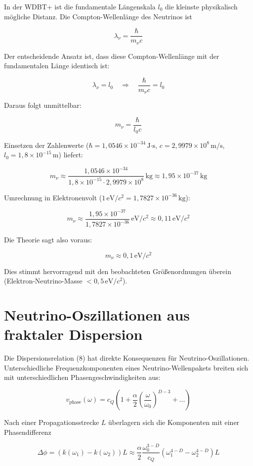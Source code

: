 \documentclass[12pt,a4paper]{article}
\begin{document}
In der WDBT+ ist die fundamentale Längenskala \(l_0\) die kleinste physikalisch mögliche Distanz. Die Compton-Wellenlänge des Neutrinos ist

\[
\lambda_\nu = \frac{\hbar}{m_\nu c}
\]

Der entscheidende Ansatz ist, dass diese Compton-Wellenlänge mit der fundamentalen Länge identisch ist:

\[
\lambda_\nu = l_0 \quad \Rightarrow \quad \frac{\hbar}{m_\nu c} = l_0
\]

Daraus folgt unmittelbar:

\[
\boxed{m_\nu = \frac{\hbar}{l_0 c}} \tag{9}
\]

Einsetzen der Zahlenwerte (\(\hbar = 1,0546 \times 10^{-34} \, \text{J·s}\), \(c = 2,9979 \times 10^8 \, \text{m/s}\), \(l_0 = 1,8 \times 10^{-15} \, \text{m}\)) liefert:

\[
m_\nu \approx \frac{1,0546 \times 10^{-34}}{1,8 \times 10^{-15} \cdot 2,9979 \times 10^8} \, \text{kg} \approx 1,95 \times 10^{-37} \, \text{kg}
\]

Umrechnung in Elektronenvolt (\(1 \, \text{eV}/c^2 = 1,7827 \times 10^{-36} \, \text{kg}\)):

\[
m_\nu \approx \frac{1,95 \times 10^{-37}}{1,7827 \times 10^{-36}} \, \text{eV}/c^2 \approx 0,11 \, \text{eV}/c^2
\]

Die Theorie sagt also voraus:

\[
\boxed{m_\nu \approx 0,1 \, \text{eV}/c^2} \tag{10}
\]

Dies stimmt hervorragend mit den beobachteten Größenordnungen überein (Elektron-Neutrino-Masse \(< 0,5 \, \text{eV}/c^2\)).

\section{Neutrino-Oszillationen aus fraktaler Dispersion} \label{sec:oszillationen}

Die Dispersionsrelation (8) hat direkte Konsequenzen für Neutrino-Oszillationen. Unterschiedliche Frequenzkomponenten eines Neutrino-Wellenpakets breiten sich mit unterschiedlichen Phasengeschwindigkeiten aus:

\[
v_{\text{phase}}(\omega) = c_Q \left( 1 + \frac{\alpha}{2} \left( \frac{\omega}{\omega_0} \right)^{D-3} + \dots \right)
\]

Nach einer Propagationsstrecke \(L\) überlagern sich die Komponenten mit einer Phasendifferenz

\[
\Delta \phi = \left( k(\omega_1) - k(\omega_2) \right) L \approx \frac{\alpha}{2} \frac{\omega_0^{3-D}}{c_Q} (\omega_1^{4-D} - \omega_2^{4-D}) L
\]
\end{document}
